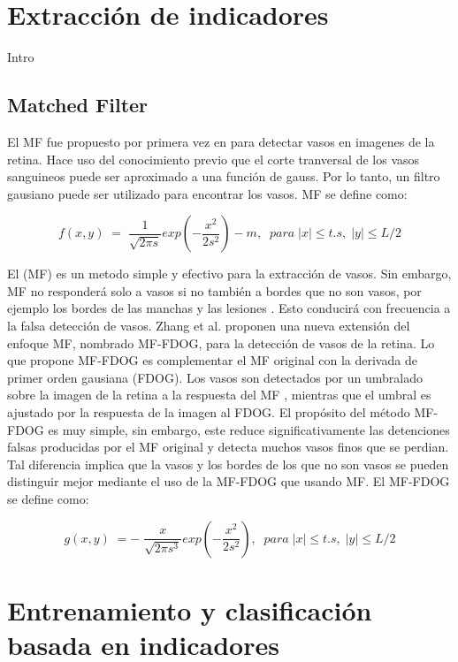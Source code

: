 \section{Extracci\'on de indicadores}

Intro

\subsection{Matched Filter}

El MF fue propuesto por primera vez en \cite{chaudhuri1989detection} para detectar vasos en imagenes de la retina. Hace uso del conocimiento previo que el corte tranversal de los vasos sanguineos puede ser aproximado a una función de gauss. Por lo tanto, un filtro gausiano puede ser utilizado para encontrar los vasos. MF se define como: 

\begin{displaymath}
f(x,y)\;=\;\frac1{\sqrt{2\pi s}}exp(-\frac{x^2}{2s^2})-m,\;\;para\;\left|x\right|\leq t.s,\;\left|y\right|\leq L/2
\end{displaymath}

El (MF) es un metodo simple y efectivo para  la extracción de vasos. Sin embargo, MF no responderá solo a vasos si no también a bordes que no son vasos, por ejemplo los bordes de las manchas y las lesiones . Esto conducirá con frecuencia a la falsa detección de vasos. Zhang et al. \cite{zhang2010retinal} proponen una nueva extensión del enfoque MF, nombrado MF-FDOG, para la detección de vasos de la retina. Lo que propone MF-FDOG es complementar el MF original con la derivada de primer orden gausiana (FDOG). Los vasos son detectados por un umbralado sobre la imagen de la retina a la respuesta del MF , mientras que el umbral es ajustado por la respuesta de la imagen al FDOG. El propósito del método  MF-FDOG  es muy simple, sin embargo, este reduce significativamente las detenciones falsas producidas por el MF original y detecta muchos vasos finos que se perdian.  Tal diferencia implica que la vasos y los bordes de los que no son vasos se pueden distinguir mejor mediante el uso de la MF-FDOG que usando MF. El MF-FDOG se define como:

\begin{displaymath}
g(x,y)\;=-\;\frac x{\sqrt{2\pi s^3}}exp(-\frac{x^2}{2s^2}),\;\;para\;\left|x\right|\leq t.s,\;\left|y\right|\leq L/2
\end{displaymath}


\section{Entrenamiento y clasificaci\'on basada en indicadores}


